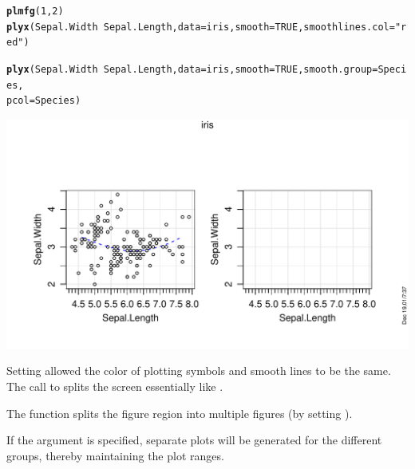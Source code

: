 \documentclass[11pt]{article}\usepackage[]{graphicx}\usepackage[]{color}
\makeatletter
\def\maxwidth{ %
  \ifdim\Gin@nat@width>\linewidth
    \linewidth
  \else
    \Gin@nat@width
  \fi
}
\newcommand{\hlnum}[1]{\textcolor[rgb]{0.686,0.059,0.569}{#1}}%
\newcommand{\hlstr}[1]{\textcolor[rgb]{0.192,0.494,0.8}{#1}}%
\newcommand{\hlopt}[1]{\textcolor[rgb]{0,0,0}{#1}}%
\newcommand{\hlstd}[1]{\textcolor[rgb]{0.345,0.345,0.345}{#1}}%
\newcommand{\hlkwc}[1]{\textcolor[rgb]{0.333,0.667,0.333}{#1}}%
\newcommand{\hlkwd}[1]{\textcolor[rgb]{0.737,0.353,0.396}{\textbf{#1}}}%
\newenvironment{kframe}{%
 \def\at@end@of@kframe{}%
 \ifinner\ifhmode%
  \def\at@end@of@kframe{\end{minipage}}%
  \begin{minipage}{\columnwidth}%
 \fi\fi%
 \def\FrameCommand##1{\hskip\@totalleftmargin \hskip-\fboxsep
 \colorbox{shadecolor}{##1}\hskip-\fboxsep
     \hskip-\linewidth \hskip-\@totalleftmargin \hskip\columnwidth}%
 \MakeFramed {\advance\hsize-\width
   \@totalleftmargin\z@ \linewidth\hsize
   \@setminipage}}%
 {\par\unskip\endMakeFramed%
 \at@end@of@kframe}
\newenvironment{knitrout}{}{} %
\makeatother
\begin{document}
\begin{knitrout}
\color{fgcolor}\begin{kframe}
\begin{alltt}
\hlkwd{plmfg}\hlstd{(}\hlnum{1}\hlstd{,}\hlnum{2}\hlstd{)}
\hlkwd{plyx}\hlstd{(Sepal.Width}\hlopt{~}\hlstd{Sepal.Length,} \hlkwc{data}\hlstd{=iris,} \hlkwc{smooth}\hlstd{=}\hlnum{TRUE}\hlstd{,} \hlkwc{smoothlines.col}\hlstd{=}\hlstr{"red"}\hlstd{)}

\hlkwd{plyx}\hlstd{(Sepal.Width}\hlopt{~}\hlstd{Sepal.Length,} \hlkwc{data}\hlstd{=iris,} \hlkwc{smooth}\hlstd{=}\hlnum{TRUE}\hlstd{,} \hlkwc{smooth.group}\hlstd{=Species,}
     \hlkwc{pcol}\hlstd{=Species)}
\end{alltt}


{\ttfamily\noindent\bfseries\color{errorcolor}{\#\# Error in smoothline\$y[lig, 1]: incorrect number of dimensions}}\end{kframe}
\includegraphics[width=\maxwidth]{figure/plyx_smooth-1} 

\end{knitrout}
Setting  allowed the color of plotting symbols and smooth
lines to be the same.
The call to  splits the screen essentially like 
.

The function  splits the figure region into multiple figures 
(by setting ).

If the argument  is specified, separate plots will be generated
for the different groups, thereby maintaining the plot ranges.
\end{document}
